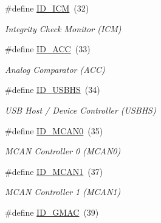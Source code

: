 \begin{DoxyCompactItemize}
\#define \mbox{\hyperlink{group__SAME70J19__id_ga8aca300be73b0a6b95f5a89a0726c994}{I\+D\+\_\+\+I\+CM}}~(32)
\begin{DoxyCompactList}\small\item\em Integrity Check Monitor (I\+CM) \end{DoxyCompactList}\item 
\mbox{\label{group__SAME70J19__id_ga8f930668b234462fdbcc2d55c764353a}} 
\#define \mbox{\hyperlink{group__SAME70J19__id_ga8f930668b234462fdbcc2d55c764353a}{I\+D\+\_\+\+A\+CC}}~(33)
\begin{DoxyCompactList}\small\item\em Analog Comparator (A\+CC) \end{DoxyCompactList}\item 
\mbox{\label{group__SAME70J19__id_gad3ee33b53a18d976324219dd4664a5b4}} 
\#define \mbox{\hyperlink{group__SAME70J19__id_gad3ee33b53a18d976324219dd4664a5b4}{I\+D\+\_\+\+U\+S\+B\+HS}}~(34)
\begin{DoxyCompactList}\small\item\em U\+SB Host / Device Controller (U\+S\+B\+HS) \end{DoxyCompactList}\item 
\mbox{\label{group__SAME70J19__id_ga9ac2e3598fa6d12eb1bc9a843119f05b}} 
\#define \mbox{\hyperlink{group__SAME70J19__id_ga9ac2e3598fa6d12eb1bc9a843119f05b}{I\+D\+\_\+\+M\+C\+A\+N0}}~(35)
\begin{DoxyCompactList}\small\item\em M\+C\+AN Controller 0 (M\+C\+A\+N0) \end{DoxyCompactList}\item 
\mbox{\label{group__SAME70J19__id_gab7a2a99f429a02c17a0caec3a5fe474f}} 
\#define \mbox{\hyperlink{group__SAME70J19__id_gab7a2a99f429a02c17a0caec3a5fe474f}{I\+D\+\_\+\+M\+C\+A\+N1}}~(37)
\begin{DoxyCompactList}\small\item\em M\+C\+AN Controller 1 (M\+C\+A\+N1) \end{DoxyCompactList}\item 
\mbox{\label{group__SAME70J19__id_ga858f0cfe0863a23a45e82da97be5a811}} 
\#define \mbox{\hyperlink{group__SAME70J19__id_ga858f0cfe0863a23a45e82da97be5a811}{I\+D\+\_\+\+G\+M\+AC}}~(39)

\end{DoxyCompactItemize}
